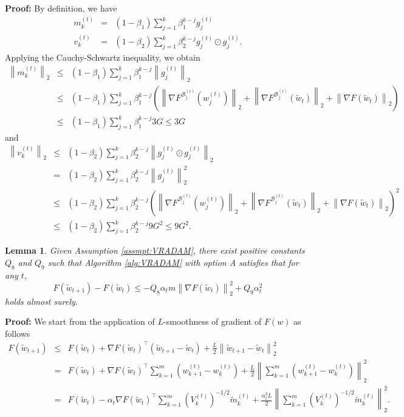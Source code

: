\documentclass[twoside]{article}
\def\BB{\mathcal{B}}
\newtheorem{lemma}{Lemma}
\begin{document}
\textbf{Proof:} By definition, we have
\begin{eqnarray}
m_k^{(t)} &=& (1-\beta_1) \sum_{j=1}^{k}\beta_1^{k-j} g_j^{(t)}\nonumber\\
v_k ^{(t)} &=& (1-\beta_2) \sum_{j=1}^{k} \beta_2^{k-j} g_j^{(t)}\odot g_j^{(t)}.\nonumber
\end{eqnarray}
Applying the Cauchy-Schwartz inequality, we obtain
\begin{eqnarray}
\left\|m_k^{(t)}\right\|_2 &\leq& (1-\beta_1) \sum_{j=1}^k \beta_1^{k-j} \left\|g_j^{(t)}\right\|_2 \nonumber\\
&\leq& (1-\beta_1) \sum_{j=1}^k \beta_1^{k-j} \left(\left\|\nabla F^{\BB_j^{(t)}}\left(w_j^{(t)}\right)\right\|_2 + \left\|\nabla F^{\BB_j^{(t)}}\left(\widetilde w_t\right)\right\|_2 + \left\|\nabla F\left(\widetilde w_t\right)\right\|_2\right)\nonumber\\
&\leq& (1-\beta_1) \sum_{j=1}^k\beta_1^{k-j} 3G \leq 3G\nonumber
\end{eqnarray}
and
\begin{eqnarray}
\left\|v_k^{(t)}\right\|_2 &\leq& (1-\beta_2)\sum_{j=1}^k \beta_2^{k-j} \left\|g_j^{(t)}\odot g_j^{(t)}\right\|_2 \nonumber\\
&=&  (1-\beta_2)\sum_{j=1}^k \beta_2^{k-j} \left\|g_j^{(t)}\right\|_2^2 \nonumber\\
&\leq&(1-\beta_2) \sum_{j=1}^k \beta_2^{k-j} \left(\left\|\nabla F^{\BB_j^{(t)}}\left(w_j^{(t)}\right)\right\|_2 + \left\|\nabla F^{\BB_j^{(t)}}\left(\widetilde w_t\right)\right\|_2 + \left\|\nabla F\left(\widetilde w_t\right)\right\|_2\right)^2\nonumber\\
&\leq&(1-\beta_2)\sum_{j=1}^k \beta_2^{k-j} 9G^2 \leq 9G^2.\nonumber
\end{eqnarray}
\begin{lemma}
\label{lem:BoundStepVR}
Given Assumption \ref{assmpt:VRADAM}, there exist positive constants $Q_8$ and $Q_9$ such that Algorithm \ref{alg:VRADAM} with option A satisfies that for any $t$, 
\begin{equation*}
F(\widetilde w_{t+1}) - F(\widetilde w_t) \leq - Q_8 \alpha_t m \left\|\nabla F(\widetilde w_t)\right\|_2^2 + Q_9 \alpha_t^2
\end{equation*}
holds almost surely.
\end{lemma}
\textbf{Proof:}
We start from the application of $L$-smoothness of gradient of $F(w)$ as follows
\begin{eqnarray}
F(\widetilde{w}_{t+1}) &\leq& F(\widetilde{w}_t) + \nabla F(\widetilde{w}_t) ^\top (\widetilde{w}_{t+1} - \widetilde{w}_t) + \frac{L}{2}\left\|\widetilde{w}_{t+1} - \widetilde{w}_t\right\|_2^2 \nonumber\\
&=& F(\widetilde{w}_t) + \nabla F(\widetilde{w}_t) ^\top \sum_{k=1}^{m} \left(w^{(t)}_{k+1} - w^{(t)}_{k}\right) + \frac{L}{2}\left\|\sum_{k=1}^{m} \left(w^{(t)}_{k+1} - w^{(t)}_{k}\right)\right\|_2^2\nonumber \\
&=& F(\widetilde w_{t}) -\alpha_t \nabla F(\widetilde w_t)^\top\sum_{k=1}^{m} \left(V_k^{(t)}\right)^{-1/2} \widetilde m_k^{(t)} + \frac{\alpha_t^2L}{2}\left\|\sum_{k=1}^{m}\left(V_k^{(t)}\right)^{-1/2} \widetilde m_k^{(t)}\right\|_2^2.\nonumber
\end{eqnarray}
\end{document}
